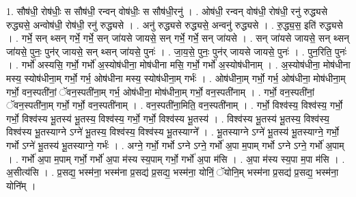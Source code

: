 \documentclass[17pt]{extarticle}
\begin{document}
1. सौष॑धी॒ रोष॑धीः॒ स सौष॑धी॒ रन्वन् वोष॑धीः॒ स सौष॑धी॒रनु॑ । . ओष॑धी॒ रन्वन् वोष॑धी॒ रोष॑धी॒ रनु॑ रुद्ध्यसे रुद्ध्यसे॒ अन्वोष॑धी॒ रोष॑धी॒ रनु॑ रुद्ध्यसे । . अनु॑ रुद्ध्यसे रुद्ध्यसे॒ अन्वनु॑ रुद्ध्यसे । . रु॒द्ध्य॒स॒ इति॑ रुद्ध्यसे । . गर्भे॒ सन् थ्सन् गर्भे॒ गर्भे॒ सन् जा॑यसे जायसे॒ सन् गर्भे॒ गर्भे॒ सन् जा॑यसे । . सन् जा॑यसे जायसे॒ सन् थ्सन् जा॑यसे॒ पुनः॒ पुन॑र् जायसे॒ सन् थ्सन् जा॑यसे॒ पुनः॑ । . जा॒य॒से॒ पुनः॒ पुन॑र् जायसे जायसे॒ पुनः॑ । . पुन॒रिति॒ पुनः॑ । . गर्भो॑ अस्यसि॒ गर्भो॒ गर्भो॑ अ॒स्योष॑धीना॒ मोष॑धीना मसि॒ गर्भो॒ गर्भो॑ अ॒स्योष॑धीनाम् । . अ॒स्योष॑धीना॒ मोष॑धीना मस्य॒ स्योष॑धीना॒म् गर्भो॒ गर्भ॒ ओष॑धीना मस्य॒ स्योष॑धीना॒म् गर्भः॑ । . ओष॑धीना॒म् गर्भो॒ गर्भ॒ ओष॑धीना॒ मोष॑धीना॒म् गर्भो॒ वन॒स्पती॑नां॒ ॅवन॒स्पती॑ना॒म् गर्भ॒ ओष॑धीना॒ मोष॑धीना॒म् गर्भो॒ वन॒स्पती॑नाम् । . गर्भो॒ वन॒स्पती॑नां॒ ॅवन॒स्पती॑ना॒म् गर्भो॒ गर्भो॒ वन॒स्पती॑नाम् । . वन॒स्पती॑ना॒मिति॒ वन॒स्पती॑नाम् । . गर्भो॒ विश्व॑स्य॒ विश्व॑स्य॒ गर्भो॒ गर्भो॒ विश्व॑स्य भू॒तस्य॑ भू॒तस्य॒ विश्व॑स्य॒ गर्भो॒ गर्भो॒ विश्व॑स्य भू॒तस्य॑ । . विश्व॑स्य भू॒तस्य॑ भू॒तस्य॒ विश्व॑स्य॒ विश्व॑स्य भू॒तस्याग्ने ऽग्ने॑ भू॒तस्य॒ विश्व॑स्य॒ विश्व॑स्य भू॒तस्याग्ने᳚ । . भू॒तस्याग्ने ऽग्ने॑ भू॒तस्य॑ भू॒तस्याग्ने॒ गर्भो॒ गर्भो ऽग्ने॑ भू॒तस्य॑ भू॒तस्याग्ने॒ गर्भः॑ । . अग्ने॒ गर्भो॒ गर्भो ऽग्ने ऽग्ने॒ गर्भो॑ अ॒पा म॒पाम् गर्भो ऽग्ने ऽग्ने॒ गर्भो॑ अ॒पाम् । . गर्भो॑ अ॒पा म॒पाम् गर्भो॒ गर्भो॑ अ॒पा म॑स्य स्य॒पाम् गर्भो॒ गर्भो॑ अ॒पा म॑सि । . अ॒पा म॑स्य स्य॒पा म॒पा म॑सि । . अ॒सीत्य॑सि । . प्र॒सद्य॒ भस्म॑ना॒ भस्म॑ना प्र॒सद्य॑ प्र॒सद्य॒ भस्म॑ना॒ योनिं॒ ॅयोनि॒म् भस्म॑ना प्र॒सद्य॑ प्र॒सद्य॒ भस्म॑ना॒ योनि᳚म् । \newline
\end{document}
